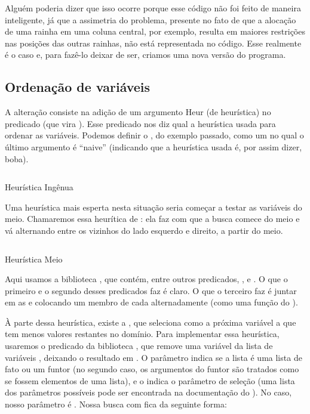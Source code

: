 \documentclass{article}
\begin{document}
Alguém poderia dizer que isso ocorre porque esse código não foi feito de maneira inteligente,
já que a assimetria do problema, presente no fato de que a alocação de uma rainha em uma coluna
central, por exemplo, resulta em maiores restrições nas posições das outras rainhas, não está
representada no código. Esse realmente é o caso e, para fazê-lo deixar de ser, criamos uma nova
versão do programa.

\subsection{Ordenação de variáveis}

A alteração consiste na adição de um argumento Heur (de heurística) no predicado 
(que vira ). Esse predicado nos diz qual a heurística usada para ordenar as variáveis.
Podemos definir o , do exemplo passado, como um  no qual o
último argumento é ``naive'' (indicando que a heurística usada é, por assim dizer, boba).

    \begin{listing}[!h]
    \inputminted{prolog}{../Exemplos/Cap11/prog2_queensHeurNaive.ecl}
    \caption{Heurística Ingênua}
    \end{listing}

Uma heurística mais esperta nesta situação seria começar a testar as variáveis do meio. Chamaremos
essa heurítica de : ela faz com que a busca comece do meio e vá alternando
entre os vizinhos do lado esquerdo e direito, a partir do meio.

    \begin{listing}[!h]
    \inputminted{prolog}{../Exemplos/Cap11/prog3_queensHeurMout.ecl}
    \caption{Heurística Meio}

    \end{listing}

Aqui usamos a biblioteca , que contém, entre outros predicados, ,
 e . O que o primeiro e o segundo desses predicados faz é
claro. O que o terceiro faz é juntar em  as  e
 colocando um membro de cada alternadamente (como uma função
 do ).

À parte dessa heurística, existe a , que seleciona como a próxima variável a
que tem menos valores restantes no domínio. Para implementar essa heurística, usaremos o predicado
da biblioteca  , que remove uma variável
 da lista de variáveis , deixando o resultado em . O parâmetro 
indica se a lista é uma lista de fato ou um funtor (no segundo caso, os argumentos do funtor são
tratados como se fossem elementos de uma lista), e o  indica o parâmetro de seleção (uma
lista dos parâmetros possíveis pode ser encontrada na documentação do \eclipse). No caso, nosso
parâmetro  é . Nossa busca com  fica da seguinte
forma:
\end{document}

